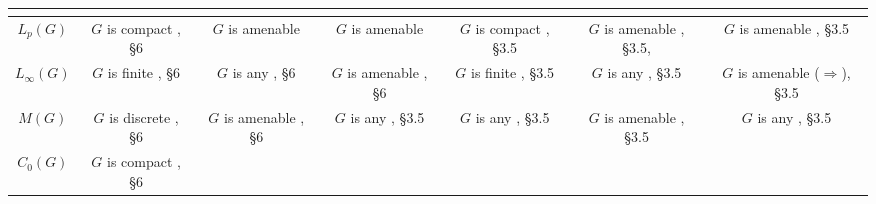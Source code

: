 \documentclass{article}
\theoremstyle{plain}
\theoremstyle{definition}
\begin{document}
\begin{fulltext}
\begin{table}[ht]
\begin{tiny}
\begin{tabular}{|c|c|c|c|c|c|c|}
{			} \\ 
        \hline
            $L_p(G)$ & 
			\shortstack{
				$G$ is compact \\ \cite{DalPolHomolPropGrAlg}, \S 6
			} & 
			\shortstack{
				$G$ is amenable \\ \cite{RachInjModAndAmenGr}
			} & 
			\shortstack{
				$G$ is amenable \\ \cite{RachInjModAndAmenGr}
			} & 
			\shortstack{
				$G$ is compact \\ \cite{RamsHomPropSemgroupAlg}, \S 3.5
			} & 
			\shortstack{
				$G$ is amenable \\ \cite{RamsHomPropSemgroupAlg}, \S 3.5, \cite{RachInjModAndAmenGr}
			} & 
			\shortstack{
				$G$ is amenable \\ \cite{RamsHomPropSemgroupAlg}, \S 3.5
			} \\
        \hline
            $L_\infty(G)$ & 
			\shortstack{
				$G$ is finite \\ \cite{DalPolHomolPropGrAlg}, \S 6
			} & 
			\shortstack{
				$G$ is any \\ \cite{DalPolHomolPropGrAlg}, \S 6
			} & 
			\shortstack{
				$G$ is amenable \\ \cite{DalPolHomolPropGrAlg}, \S 6
			} & 
			\shortstack{
				$G$ is finite \\ \cite{RamsHomPropSemgroupAlg}, \S 3.5
			} & 
			\shortstack{
				$G$ is any \\ \cite{RamsHomPropSemgroupAlg}, \S 3.5
			} & 
			\shortstack{
				$G$ is amenable \\ ($\Longrightarrow$)\cite{RamsHomPropSemgroupAlg}, \S 3.5
			} \\ 
        \hline
            $M(G)$ & 
			\shortstack{
				$G$ is discrete \\ \cite{DalPolHomolPropGrAlg}, \S 6
			} & 
			\shortstack{
				$G$ is amenable \\ \cite{DalPolHomolPropGrAlg}, \S 6
			} & 
			\shortstack{
				$G$ is any \\ \cite{RamsHomPropSemgroupAlg}, \S 3.5
			} & 
			\shortstack{
				$G$ is any \\ \cite{RamsHomPropSemgroupAlg}, \S 3.5
			} & 
			\shortstack{
				$G$ is amenable \\ \cite{RamsHomPropSemgroupAlg}, \S 3.5
			} & 
			\shortstack{
				$G$ is any \\ \cite{RamsHomPropSemgroupAlg}, \S 3.5
			} \\ 
        \hline
            $C_0(G)$ & 
			\shortstack{
				$G$ is compact \\ \cite{DalPolHomolPropGrAlg}, \S 6
}
\end{tabular}
\end{tiny}
\end{table}
\end{fulltext}
\end{document}
